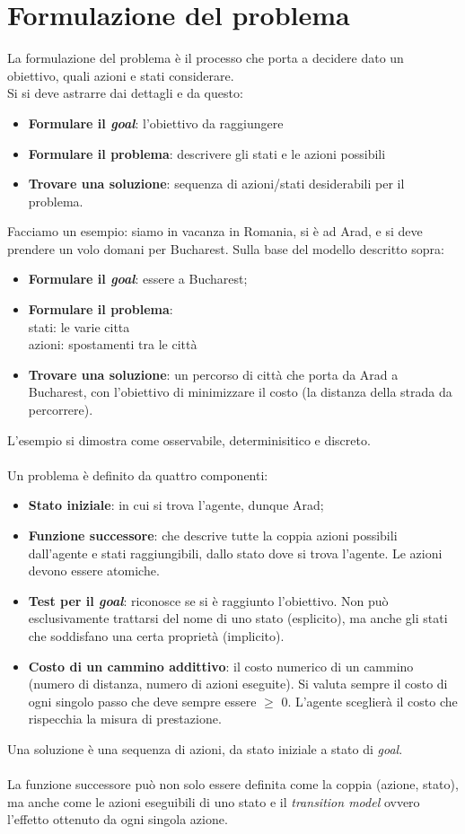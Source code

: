 \documentclass[10pt,a4paper]{book}
\begin{document}
\section{Formulazione del problema}
La formulazione del problema \`e il processo che porta a decidere dato un obiettivo, quali azioni e stati considerare.\\
Si si deve astrarre dai dettagli e da questo:
\begin{itemize}
\item \textbf{Formulare il \textit{goal}}: l'obiettivo da raggiungere
\item \textbf{Formulare il problema}: descrivere gli stati e le azioni possibili
\item \textbf{Trovare una soluzione}: sequenza di azioni/stati desiderabili per il problema.
\end{itemize}
\noindent
Facciamo un esempio: siamo in vacanza in Romania, si \`e ad Arad, e si deve prendere un volo domani per Bucharest. Sulla base del modello descritto sopra:
\begin{itemize}
\item \textbf{Formulare il \textit{goal}}: essere a Bucharest;
\item \textbf{Formulare il problema}:\\ stati: le varie citta\\
azioni: spostamenti tra le citt\`a
\item \textbf{Trovare una soluzione}: un percorso di citt\`a che porta da Arad a Bucharest, con l'obiettivo di minimizzare il costo (la distanza della strada da percorrere).
\end{itemize}
\noindent
L'esempio si dimostra come osservabile, determinisitico e discreto.\\\\
Un problema \`e definito da quattro componenti:
\begin{itemize}
\item  \textbf{Stato iniziale}: in cui si trova l'agente, dunque Arad;
\item  \textbf{Funzione successore}: che descrive tutte la coppia azioni possibili dall'agente e stati raggiungibili, dallo stato dove si trova l'agente. Le azioni devono essere atomiche.
\item  \textbf{Test per il \textit{goal}}: riconosce se si \`e raggiunto l'obiettivo. Non pu\`o esclusivamente trattarsi del nome di uno stato (esplicito), ma anche gli stati che soddisfano una certa propriet\`a (implicito).
\item  \textbf{Costo di un cammino addittivo}: il costo numerico di un cammino (numero di distanza, numero di azioni eseguite).  Si valuta sempre il costo di ogni singolo passo che deve sempre essere $\ge$ 0. L'agente sceglier\`a il costo che rispecchia la misura di prestazione.
\end{itemize}
\noindent
Una soluzione \`e una sequenza di azioni, da stato iniziale a stato di \textit{goal}.\\\\
La funzione successore pu\`o non solo essere definita come la coppia (azione, stato), ma anche come le azioni eseguibili di uno stato e il \textit{transition model} ovvero l'effetto ottenuto da ogni singola azione.
\end{document}
